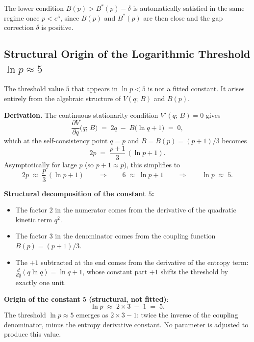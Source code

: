 \documentclass[12pt,a4paper]{article}
\theoremstyle{definition}
\theoremstyle{remark}
\begin{document}
The lower condition $B(p) > B^*(p) - \delta$ is automatically satisfied in the
same regime once $p < e^5$, since $B(p)$ and $B^*(p)$ are then close and the
gap correction $\delta$ is positive.

\subsection{Structural Origin of the Logarithmic Threshold $\ln p \approx 5$}
\label{sec:pss:s3:origin}

The threshold value $5$ that appears in $\ln p < 5$ is not a fitted constant.
It arises entirely from the algebraic structure of $V(q;\,B)$ and $B(p)$.

\medskip
\textbf{Derivation.}
The continuous stationarity condition $V'(q;\,B) = 0$ gives
\[
  \frac{\partial V}{\partial q}\bigl(q;\,B\bigr)
  \;=\; 2q \;-\; B\bigl(\ln q + 1\bigr) \;=\; 0,
\]
which at the self-consistency point $q = p$ and $B = B(p) = (p+1)/3$ becomes
\[
  2p \;=\; \frac{p+1}{3}\,(\ln p + 1).
\]
Asymptotically for large $p$ (so $p+1 \approx p$), this simplifies to
\[
  2p \;\approx\; \frac{p}{3}\,(\ln p + 1)
  \qquad\Longrightarrow\qquad
  6 \;\approx\; \ln p + 1
  \qquad\Longrightarrow\qquad
  \ln p \;\approx\; 5.
\]

\medskip
\textbf{Structural decomposition of the constant $5$:}
\begin{itemize}
  \item The factor $2$ in the numerator comes from the derivative of the quadratic
        kinetic term $q^2$.
  \item The factor $3$ in the denominator comes from the coupling function
        $B(p) = (p+1)/3$.
  \item The $+1$ subtracted at the end comes from the derivative of the entropy
        term: $\tfrac{d}{dq}(q\ln q) = \ln q + 1$, whose constant part $+1$
        shifts the threshold by exactly one unit.
\end{itemize}

\begin{resultbox}
\textbf{Origin of the constant $5$ (structural, not fitted)}:
\[
  \ln p \;\approx\; 2 \times 3 \;-\; 1 \;=\; 5.
\]
The threshold $\ln p \approx 5$ emerges as $2 \times 3 - 1$:
twice the inverse of the coupling denominator, minus the entropy derivative
constant.  No parameter is adjusted to produce this value.
\end{resultbox}
\end{document}
